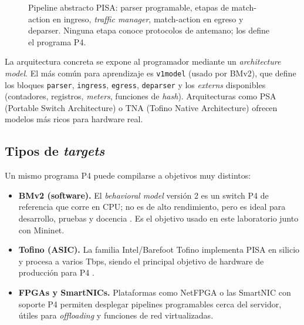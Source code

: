 \documentclass[conference,onecolumn,10pt]{IEEEtran}
\begin{document}
\begin{figure}[t]
\centering
{}
\caption{Pipeline abstracto PISA: parser programable, etapas de match-action en
ingreso, \emph{traffic manager}, match-action en egreso y deparser. Ninguna
etapa conoce protocolos de antemano; los define el programa P4.}
\label{fig:pisa}
\end{figure}

La arquitectura concreta se expone al programador mediante un \emph{architecture
model}. El más común para aprendizaje es \texttt{v1model} (usado por BMv2), que
define los bloques \texttt{parser}, \texttt{ingress}, \texttt{egress},
\texttt{deparser} y los \emph{externs} disponibles (contadores, registros,
\emph{meters}, funciones de \emph{hash}). Arquitecturas como PSA (Portable Switch
Architecture) o TNA (Tofino Native Architecture) ofrecen modelos más ricos para
hardware real.

\subsection{Tipos de \emph{targets}}
Un mismo programa P4 puede compilarse a objetivos muy distintos:

\begin{itemize}
\item \textbf{BMv2 (software).} El \emph{behavioral model} versión 2 es un switch
P4 de referencia que corre en CPU; no es de alto rendimiento, pero es ideal para
desarrollo, pruebas y docencia \cite{bmv2}. Es el objetivo usado en este
laboratorio junto con Mininet.
\item \textbf{Tofino (ASIC).} La familia Intel/Barefoot Tofino implementa PISA en
silicio y procesa a varios Tbps, siendo el principal objetivo de hardware de
producción para P4 \cite{bosshart2013rmt}.
\item \textbf{FPGAs y SmartNICs.} Plataformas como NetFPGA o las SmartNIC con
soporte P4 permiten desplegar pipelines programables cerca del servidor,
útiles para \emph{offloading} y funciones de red virtualizadas.
\end{itemize}
\end{document}
